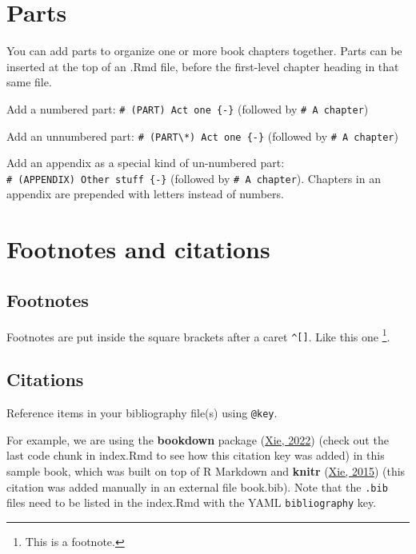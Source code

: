 \documentclass[
  12pt,
]{book}
\theoremstyle{definition}
\theoremstyle{definition}
\theoremstyle{definition}
\theoremstyle{definition}
\theoremstyle{remark}
\begin{document}
\hypertarget{parts}{%
\chapter{Parts}\label{parts}}

You can add parts to organize one or more book chapters together. Parts can be inserted at the top of an .Rmd file, before the first-level chapter heading in that same file.

Add a numbered part: \texttt{\#\ (PART)\ Act\ one\ \{-\}} (followed by \texttt{\#\ A\ chapter})

Add an unnumbered part: \texttt{\#\ (PART\textbackslash{}*)\ Act\ one\ \{-\}} (followed by \texttt{\#\ A\ chapter})

Add an appendix as a special kind of un-numbered part: \texttt{\#\ (APPENDIX)\ Other\ stuff\ \{-\}} (followed by \texttt{\#\ A\ chapter}). Chapters in an appendix are prepended with letters instead of numbers.

\hypertarget{footnotes-and-citations}{%
\chapter{Footnotes and citations}\label{footnotes-and-citations}}

\hypertarget{footnotes}{%
\section{Footnotes}\label{footnotes}}

Footnotes are put inside the square brackets after a caret \texttt{\^{}{[}{]}}. Like this one \footnote{This is a footnote.}.

\hypertarget{citations}{%
\section{Citations}\label{citations}}

Reference items in your bibliography file(s) using \texttt{@key}.

For example, we are using the \textbf{bookdown} package (\protect\hyperlink{ref-R-bookdown}{Xie, 2022}) (check out the last code chunk in index.Rmd to see how this citation key was added) in this sample book, which was built on top of R Markdown and \textbf{knitr} (\protect\hyperlink{ref-xie2015}{Xie, 2015}) (this citation was added manually in an external file book.bib).
Note that the \texttt{.bib} files need to be listed in the index.Rmd with the YAML \texttt{bibliography} key.
\end{document}
